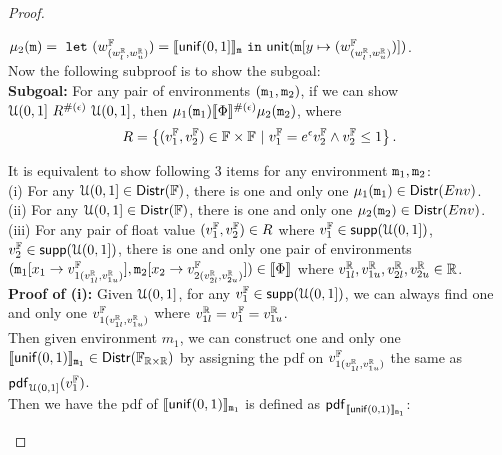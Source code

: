 \documentclass[a4paper,11pt]{article}
\begin{document}
\begin{proof}
\begin{itemize}
	$\mu_2(\mathtt{m}) = 
	~\mathtt{let}~ (w^{\mathbb{F}}_{(w^{\mathbb{R}}_{l}, w^{\mathbb{R}}_{u})})
	= \llbracket \mathsf{unif}(0, 1] \rrbracket_{\mathtt{m}} 
	~\mathtt{in}~ 
	\mathsf{unit}(\mathtt{m}[y \mapsto (w^{\mathbb{F}}_{(w^{\mathbb{R}}_{l}, w^{\mathbb{R}}_{u})})])$.
	\\
	Now the following subproof is to show the subgoal:
	\\
	\textbf{Subgoal:} For any pair of environments $(\mathtt{m}_1, \mathtt{m}_2)$, if we can show ${\mathcal{U}(0,1]} ~ R^{\#(\epsilon)} ~ {\mathcal{U}(0,1]}$, then $\mu_1(\mathtt{m}_1) \llbracket \Phi \rrbracket^{\#(\epsilon)} \mu_2(\mathtt{m}_2)$,
	where
	\[
		R = 
		\left \{(v^{\mathbb{F}}_1, v^{\mathbb{F}}_2) \in \mathbb{F} \times \mathbb{F} 
		~\vert~
		v^{\mathbb{F}}_1  = e^{\epsilon}  v^{\mathbb{F}}_2 
		\land v^{\mathbb{F}}_2 \leq 1
		\right \}.
	\]	%
	\begin{subproof}
	It is equivalent to show following 3 items for any environment $\mathtt{m}_1, \mathtt{m}_2$:
	\\
	(i) For any $\mathcal{U}(0,1]\in \mathsf{Distr}(\mathbb{F})$, there is one and only one $\mu_1(\mathtt{m}_1) \in \mathsf{Distr}(Env)$.
	\\
	(ii) For any $\mathcal{U}(0,1] \in \mathsf{Distr}(\mathbb{F})$, there is one and only one $\mu_2(\mathtt{m}_2) \in \mathsf{Distr}(Env)$.
	\\
	(iii) For any pair of float value $(v^{\mathbb{F}}_1, v^{\mathbb{F}}_2) \in R$ where 
	$v^{\mathbb{F}}_1 \in \mathsf{supp}(\mathcal{U}(0,1])$, 
	$v^{\mathbb{F}}_2 \in \mathsf{supp}(\mathcal{U}(0,1])$,
	there is one and only one pair of environments 
	$(\mathtt{m}_1[ x_1 \to v^{\mathbb{F}}_{1(v^{\mathbb{R}}_{1l}, v^{\mathbb{R}}_{1u})}], \mathtt{m}_2[x_2 \to v^{\mathbb{F}}_{2(v^{\mathbb{R}}_{2l}, v^{\mathbb{R}}_{2u})}]) \in \llbracket \Phi \rrbracket$
	where $v^{\mathbb{R}}_{1l}, v^{\mathbb{R}}_{1u}, v^{\mathbb{R}}_{2l}, v^{\mathbb{R}}_{2u} \in \mathbb{R}$.
	\\ 
	\textbf{Proof of (i):} 
	Given $\mathcal{U}(0,1]$, for any $v^{\mathbb{F}}_1 \in \mathsf{supp}(\mathcal{U}(0,1])$, 
	we can always find one and only one $v^{\mathbb{F}}_{1(v^{\mathbb{R}}_{1l}, v^{\mathbb{R}}_{1u})}$ where $v^{\mathbb{R}}_{1l} = v^{\mathbb{F}}_1 = v^{\mathbb{R}}_{1u}$.
	\\
	Then given environment $m_1$,
	we can construct one and only one $\llbracket \mathsf{unif}(0, 1) \rrbracket_{\mathtt{m}_1} \in \mathsf{Distr}(\mathbb{F}_{\mathbb{R} \times \mathbb{R}})$
	by assigning the pdf on $v^{\mathbb{F}}_{1(v^{\mathbb{R}}_{1l}, v^{\mathbb{R}}_{1u})}$ the same as $\mathsf{pdf}_{\mathcal{U}(0,1]}(v^{\mathbb{F}}_1)$. 
	\\
	Then we have the pdf of $\llbracket \mathsf{unif}(0, 1) \rrbracket_{\mathtt{m}_1}$  
	is defined as $\mathsf{pdf}_{\llbracket \mathsf{unif}(0, 1) \rrbracket_{\mathtt{m}_1}}$:

\end{subproof}
\end{itemize}
\end{proof}
\end{document}
